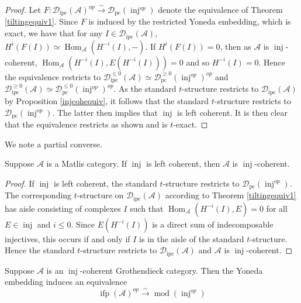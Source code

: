\documentclass[12pt,oneside]{amsart}
\DeclareMathOperator{\Hom}{Hom}
\DeclareMathOperator{\fdmod}{mod}
\DeclareMathOperator{\inj}{inj}
\DeclareMathOperator{\ipscoh}{ipc}
\DeclareMathOperator{\ifp}{ifp}
\DeclareMathOperator{\pc}{pc}
\begin{document}
\begin{proof}
Let $F: \mathcal{D}_{\ipscoh}(\mathcal{A})^{op} \xrightarrow{\sim} \mathcal{D}_{\pc}(\inj^{op})$ denote the equivalence of Theorem \ref{tiltingequiv1}.  Since $F$ is induced by the restricted Yoneda embedding, which is exact,  we have that for any $I \in \mathcal{D}_{\ipscoh}(\mathcal{A})$,  $H^i(F(I)) \simeq \Hom_{\mathcal{A}}(H^{-i}(I),-)$. If $H^i(F(I)) = 0$, then as $\mathcal{A}$ is $\inj$-coherent, $\Hom_{\mathcal{A}}(H^{-i}(I),E(H^{-i}(I))) = 0$ and so $H^{-i}(I) = 0$. Hence the equivalence restricts to $\mathcal{D}^{\leq 0}_{\ipscoh}(\mathcal{A}) \simeq \mathcal{D}^{\geq 0}_{\pc}(\inj^{op})^{op}$ and $\mathcal{D}^{\geq 0}_{\ipscoh}(\mathcal{A}) \simeq \mathcal{D}^{\leq 0}_{\pc}(\inj^{op})^{op}$. As the standard $t$-structure restricts to $\mathcal{D}_{\ipscoh}(\mathcal{A})$ by Proposition \ref{injcohequiv}, it follows that the standard $t$-structure restricts to $\mathcal{D}_{\pc}(\inj^{op})$. The latter then implies that $\inj$ is left coherent. It is then clear that the equivalence restricts as shown and is $t$-exact. 
\end{proof}
We note a partial converse.

\begin{prop} \label{partialconverse}
Suppose $\mathcal{A}$ is a Matlis category. If $\inj$ is left coherent, then $\mathcal{A}$ is $\inj$-coherent.
\end{prop}

\begin{proof}
If $\inj$ is left coherent, the standard $t$-structure restricts to $\mathcal{D}_{\pc}(\inj^{op})$. The corresponding $t$-structure on $\mathcal{D}_{\ipscoh}(\mathcal{A})$ according to Theorem \ref{tiltingequiv1} has aisle consisting of complexes $I$ such that $\Hom_{\mathcal{A}}(H^{-i}(I),E) = 0$ for all $E \in \inj$ and $i \leq 0$. Since $E(H^{-i}(I))$ is a direct sum of indecomposable injectives, this occurs if and only if $I$ is in the aisle of the standard $t$-structure. Hence the standard $t$-structure restricts to $\mathcal{D}_{\ipscoh}(\mathcal{A})$ and $\mathcal{A}$ is $\inj$-coherent.
\end{proof}



\begin{cor} \label{Abelianequiv}
Suppose $\mathcal{A}$ is an $\inj$-coherent Grothendieck category. Then the Yoneda embedding induces an equivalence
\[
\ifp(\mathcal{A})^{op} \xrightarrow{\sim} \fdmod(\inj^{op})
\]
\end{cor}
\end{document}
